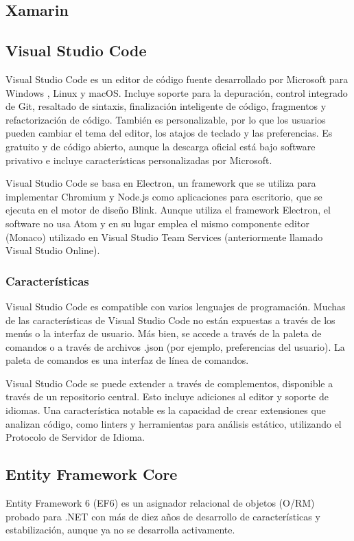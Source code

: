 \subsection{Xamarin}


\subsection{Visual Studio Code}
Visual Studio Code es un editor de código fuente desarrollado por Microsoft para Windows , Linux y macOS. Incluye soporte para la depuración, control integrado de Git, resaltado de sintaxis, finalización inteligente de código, fragmentos y refactorización de código. También es personalizable, por lo que los usuarios pueden cambiar el tema del editor, los atajos de teclado y las preferencias. Es gratuito y de código abierto, aunque la descarga oficial está bajo software privativo e incluye características personalizadas por Microsoft.

Visual Studio Code se basa en Electron, un framework que se utiliza para implementar Chromium y Node.js como aplicaciones para escritorio, que se ejecuta en el motor de diseño Blink. Aunque utiliza el framework Electron, el software no usa Atom y en su lugar emplea el mismo componente editor (Monaco) utilizado en Visual Studio Team Services (anteriormente llamado Visual Studio Online).

\subsubsection{Características}
Visual Studio Code es compatible con varios lenguajes de programación. Muchas de las características de Visual Studio Code no están expuestas a través de los menús o la interfaz de usuario. Más bien, se accede a través de la paleta de comandos o a través de archivos .json (por ejemplo, preferencias del usuario). La paleta de comandos es una interfaz de línea de comandos.

Visual Studio Code se puede extender a través de complementos, disponible a través de un repositorio central. Esto incluye adiciones al editor y soporte de idiomas. Una característica notable es la capacidad de crear extensiones que analizan código, como linters y herramientas para análisis estático, utilizando el Protocolo de Servidor de Idioma.

\subsection{Entity Framework Core}
Entity Framework 6 (EF6) es un asignador relacional de objetos (O/RM) probado para .NET con más de diez años de desarrollo de características y estabilización, aunque ya no se desarrolla activamente.


